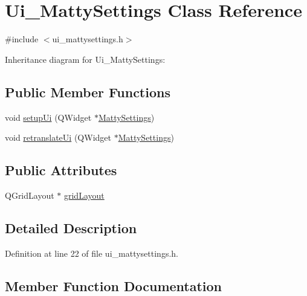 \hypertarget{classUi__MattySettings}{}\section{Ui\+\_\+\+Matty\+Settings Class Reference}
\label{classUi__MattySettings}


{\ttfamily \#include $<$ui\+\_\+mattysettings.\+h$>$}



Inheritance diagram for Ui\+\_\+\+Matty\+Settings\+:
\subsection*{Public Member Functions}
\begin{DoxyCompactItemize}
\item 
void \hyperlink{classUi__MattySettings_aa5a49194b05cc0f4d7f06d99f18e253e}{setup\+Ui} (Q\+Widget $\ast$\hyperlink{classMattySettings}{Matty\+Settings})
\item 
void \hyperlink{classUi__MattySettings_aab5e7bc10516f3837b1c4e5cd33b9a76}{retranslate\+Ui} (Q\+Widget $\ast$\hyperlink{classMattySettings}{Matty\+Settings})
\end{DoxyCompactItemize}
\subsection*{Public Attributes}
\begin{DoxyCompactItemize}
\item 
Q\+Grid\+Layout $\ast$ \hyperlink{classUi__MattySettings_a289ca61cb5fd260abf4fbe3d872f6676}{grid\+Layout}
\end{DoxyCompactItemize}


\subsection{Detailed Description}


Definition at line 22 of file ui\+\_\+mattysettings.\+h.



\subsection{Member Function Documentation}
\hypertarget{classUi__MattySettings_aab5e7bc10516f3837b1c4e5cd33b9a76}{}\label{classUi__MattySettings_aab5e7bc10516f3837b1c4e5cd33b9a76} 
